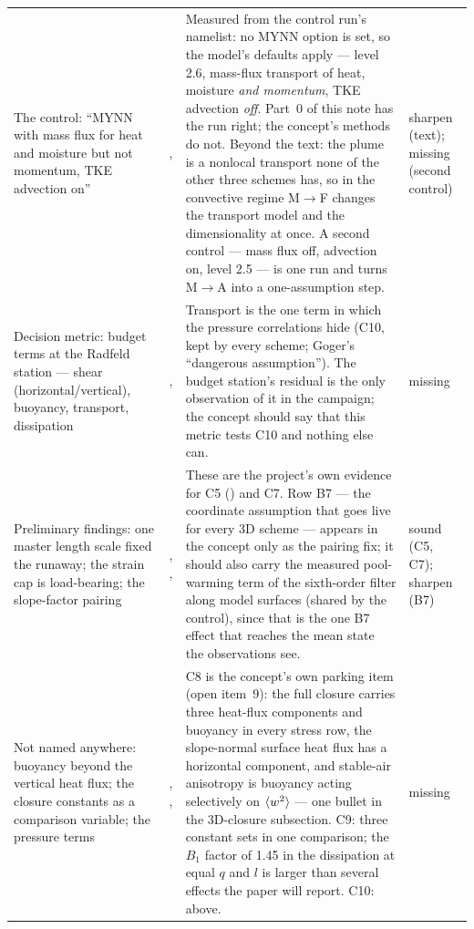 \begin{center}
\begin{xltabular}{\linewidth}{@{}>{\raggedright\arraybackslash}p{3.3cm}
  >{\raggedright\arraybackslash}p{1.4cm}
  >{\raggedright\arraybackslash}X
  >{\raggedright\arraybackslash}p{1.6cm}@{}}
\addlinespace[3pt]
The control: ``MYNN with mass flux for heat and moisture but not momentum, TKE advection on'' &
,  &
Measured from the control run's namelist: no MYNN option is set, so the model's defaults apply --- level 2.6, mass-flux transport of heat, moisture \emph{and momentum}, TKE advection \emph{off}. Part~0 of this note has the run right; the concept's methods do not. Beyond the text: the plume is a nonlocal transport none of the other three schemes has, so in the convective regime M$\to$F changes the transport model and the dimensionality at once. A second control --- mass flux off, advection on, level 2.5 --- is one run and turns M$\to$A into a one-assumption step. &
sharpen (text); missing (second control) \\
\addlinespace[3pt]
Decision metric: budget terms at the Radfeld station --- shear (horizontal/vertical), buoyancy, transport, dissipation &
,  &
Transport is the one term in which the pressure correlations hide (C10, kept by every scheme; Goger's ``dangerous assumption''). The budget station's residual is the only observation of it in the campaign; the concept should say that this metric tests C10 and nothing else can. &
missing \\
\addlinespace[3pt]
Preliminary findings: one master length scale fixed the runaway; the strain cap is load-bearing; the slope-factor pairing &
, ,  &
These are the project's own evidence for C5 () and C7. Row B7 --- the coordinate assumption that goes live for every 3D scheme --- appears in the concept only as the pairing fix; it should also carry the measured pool-warming term of the sixth-order filter along model surfaces (shared by the control), since that is the one B7 effect that reaches the mean state the observations see. &
sound (C5, C7); sharpen (B7) \\
\addlinespace[3pt]
Not named anywhere: buoyancy beyond the vertical heat flux; the closure constants as a comparison variable; the pressure terms &
, ,  &
C8 is the concept's own parking item (open item~9): the full closure carries three heat-flux components and buoyancy in every stress row, the slope-normal surface heat flux has a horizontal component, and stable-air anisotropy is buoyancy acting selectively on $\langle w^2 \rangle$ --- one bullet in the 3D-closure subsection. C9: three constant sets in one comparison; the $B_1$ factor of 1.45 in the dissipation at equal $q$ and $l$ is larger than several effects the paper will report. C10: above. &
missing \\
\end{xltabular}
\end{center}

